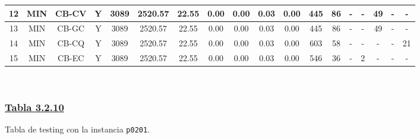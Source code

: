 {\begin{tabular}{ *{17}{c|} c }
\hline
12 & MIN & CB-CV & Y & 3089 & 2520.57 & 22.55 & 0.00 & 0.00 & 0.03 & 0.00 & 445 & 86 & - & - & 49 & - & -\\
\hline
13 & MIN & CB-GC & Y & 3089 & 2520.57 & 22.55 & 0.00 & 0.00 & 0.03 & 0.00 & 445 & 86 & - & - & 49 & - & -\\
\hline
14 & MIN & CB-CQ & Y & 3089 & 2520.57 & 22.55 & 0.00 & 0.00 & 0.03 & 0.00 & 603 & 58 & - & - & - & - & 21\\
\hline
15 & MIN & CB-EC & Y & 3089 & 2520.57 & 22.55 & 0.00 & 0.00 & 0.03 & 0.00 & 546 & 36 & - & 2 & - & - & -\\
\hline
\end{tabular}\\
\vspace{4mm}
}

\newpage

\subsubsection*{\underline{Tabla 3.2.10}}
\noindent Tabla de testing con la instancia \verb_p0201_.\\

